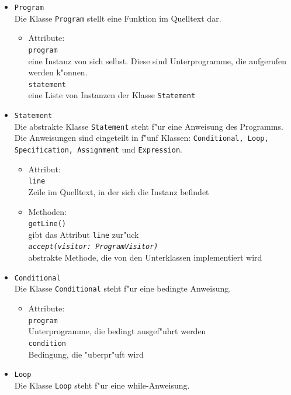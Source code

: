 \documentclass[10pt,a4paper,titlepage]{article}
\begin{document}
\begin{itemize}
\item \texttt{Program} \\
Die Klasse \texttt{Program} stellt eine Funktion im Quelltext dar. 
\begin{itemize}
\item Attribute: \\
\texttt{program} \\
eine Instanz von sich selbst. Diese sind Unterprogramme, die aufgerufen werden k"onnen.\\
\texttt{statement} \\
eine Liste von Instanzen der Klasse \texttt{Statement}
\end{itemize}
\item \texttt{Statement} \\
Die abstrakte Klasse \texttt{Statement} steht f"ur eine Anweisung des Programms. Die Anweisungen sind eingeteilt in f"unf Klassen: \texttt{Conditional, Loop, Specification, Assignment} und \texttt{Expression}. 
\begin{itemize}
\item Attribut:\\
\texttt{line} \\
Zeile im Quelltext, in der sich die Instanz befindet
\item Methoden: \\
\texttt{getLine()} \\
gibt das Attribut \texttt{line} zur"uck \\
\texttt{\textit{accept(visitor: ProgramVisitor)}}\\
abstrakte Methode, die von den Unterklassen implementiert wird
\end{itemize}
\item \texttt{Conditional} \\
Die Klasse \texttt{Conditional} steht f"ur eine bedingte Anweisung. 
\begin{itemize}
\item Attribute: \\
\texttt{program} \\
Unterprogramme, die bedingt ausgef"uhrt werden \\
\texttt{condition} \\
Bedingung, die "uberpr"uft wird
\end{itemize}
\item \texttt{Loop} \\
Die Klasse \texttt{Loop} steht f"ur eine while-Anweisung. 
\begin{itemize}

\end{itemize}
\end{itemize}
\end{document}
